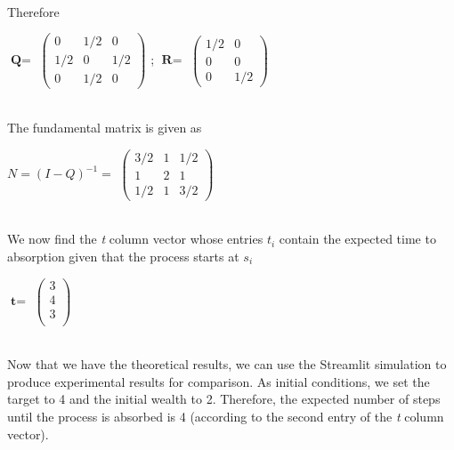 \documentclass[a4paper, 12pt]{article}
\begin{document}
\\
Therefore
\\
		\begin{center}
        $\textbf{Q} =$
           $\begin{pmatrix}
                0   & 1/2   & 0   \\
                1/2 & 0   & 1/2 \\
                0   & 1/2 & 0   
            \end{pmatrix}$
            ;
        $\textbf{R} =$
           $\begin{pmatrix}
                1/2 & 0   \\
                0   & 0   \\
                0   & 1/2  
            \end{pmatrix}$
        \end{center}
\\
The fundamental matrix is given as
\\
		\begin{center}
        $N = (I-Q)^{-1} = $
           $\begin{pmatrix}
                3/2 & 1 & 1/2 \\ 
                1   & 2 & 1   \\
                1/2 & 1 & 3/2  
            \end{pmatrix}$
        \end{center}
\\
We now find the \textit{t} column vector whose entries $t_i$ contain the expected time to absorption given that the process starts at $s_i$
\\
		\begin{center}
        $\textbf{t} =$
           $\begin{pmatrix}
                3 \\
                4 \\
                3 \\
            \end{pmatrix}$

        \end{center}
\\
Now that we have the theoretical results, we can use the Streamlit simulation to produce experimental results for comparison. 
As initial conditions, we set the target to 4 and the initial wealth to 2. Therefore, the expected number of steps until the process is absorbed is 4 (according to the second entry of the \textit{t} column vector).
\end{document}
